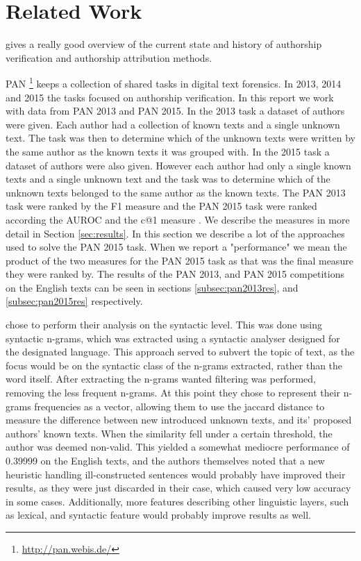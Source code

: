 \section{Related Work} \label{sec:related_work}
\cite{stamatos2009} gives a really good overview of the current state and
history of authorship verification and authorship attribution methods.

PAN \footnote{\url{http://pan.webis.de/}} keeps a collection of shared tasks in
digital text forensics. In 2013, 2014 and 2015 the tasks focused on authorship
verification. In this report we work with data from PAN 2013 and PAN 2015. In
the 2013 task a dataset of authors were given. Each author had a collection of
known texts and a single unknown text. The task was then to determine which of
the unknown texts were written by the same author as the known texts it was
grouped with. In the 2015 task a dataset of authors were also given. However
each author had only a single known texts and a single unknown text and the task
was to determine which of the unknown texts belonged to the same author as the
known texts. The PAN 2013 task were ranked by the F1 measure and the PAN 2015
task were ranked according the \gls{AUROC} and the c@1 measure \cite{penas2011}.
We describe the measures in more detail in Section \ref{sec:results}. In this
section we describe a lot of the approaches used to solve the PAN 2015 task.
When we report a "performance" we mean the product of the two measures for the
PAN 2015 task as that was the final measure they were ranked by. The results
of the PAN 2013, and PAN 2015 competitions on the English texts can be seen in
sections \ref{subsec:pan2013res}, and \ref{subsec:pan2015res} respectively.

\cite{juanpablo2015} chose to perform their analysis on the syntactic level.
This was done using syntactic n-grams, which was extracted using a syntactic
analyser designed for the designated language. This approach served to subvert
the topic of text, as the focus would be on the syntactic class of the n-grams
extracted, rather than the word itself. After extracting the n-grams wanted
filtering was performed, removing the less frequent n-grams. At this point they
chose to represent their n-grams frequencies as a vector, allowing them to use
the jaccard distance to measure the difference between new introduced unknown
texts, and its' proposed authors' known texts. When the similarity fell under
a certain threshold, the author was deemed non-valid. This yielded a somewhat
mediocre performance of 0.39999 on the English texts, and the authors themselves
noted that a new heuristic handling ill-constructed sentences would probably
have improved their results, as they were just discarded in their case, which
caused very low accuracy in some cases. Additionally, more features describing
other linguistic layers, such as lexical, and syntactic feature would probably
improve results as well.

